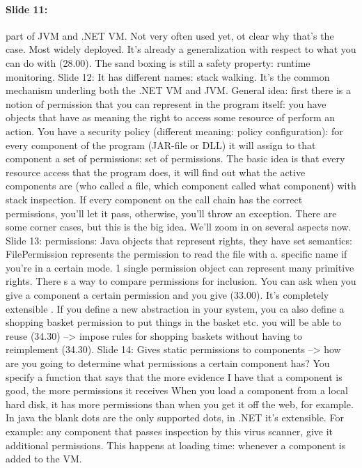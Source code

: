 \documentclass[10pt,a4paper]{report}
\begin{document}
\paragraph{Slide 11:} part of JVM and .NET VM. Not very often used yet, ot clear why that's the case. Most widely deployed. It's already a generalization with respect to what you can do with (28.00).
The sand boxing is still a safety property: runtime monitoring. 
Slide 12: It has different names: stack walking. It's the common mechanism underling both the .NET VM and JVM. 
General idea: first there is a notion of permission that you can represent in the program itself: you have objects that have as meaning the right to access some resource of perform an action. You have a security policy (different meaning: policy configuration): for every component of the program (JAR-file or DLL) it will assign to that component a set of permissions: set of permissions.
The basic idea is that every resource access that the program does, it will find out what the active components are (who called a file, which component called what component) with stack inspection. If every component on the call chain has the correct permissions, you'll let it pass, otherwise, you'll throw an exception.
There are some corner cases, but this is the big idea. We'll zoom in on several aspects now.
Slide 13: permissions: Java objects that represent rights, they have set semantics: FilePermission represents the permission to read the file with a. specific name if you're in a certain mode. 1 single permission object can represent many primitive rights. There s a way to compare permissions for inclusion. You can ask when you give a component a certain permission and you give (33.00). It's completely extensible . If you define a new abstraction in your system, you ca also define a shopping basket permission to put things in the basket etc. you will be able to reuse (34.30) --> impose rules for shopping baskets without having to reimplement (34.30).
Slide 14: Gives static permissions to components --> how are you going to determine what permissions a certain component has? You specify a function that says that the more evidence I have that a component is good, the more permissions it receives
When you load a component from a local hard disk, it has more permissions than when you get it off the web, for example.
In java the blank dots are the only supported dots, in .NET it's extensible.
For example: any component that passes inspection by this virus scanner, give it additional permissions.
This happens at loading time: whenever a component is added to the VM.
\end{document}

